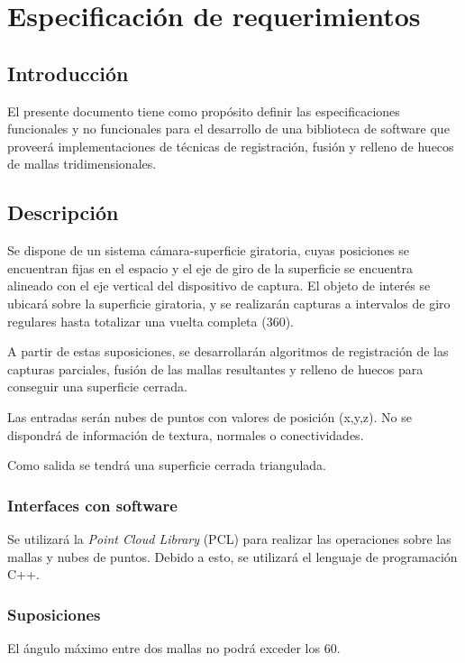 \chapter{Especificación de requerimientos}

	\section{Introducción}
	El presente documento tiene como propósito definir las especificaciones
	funcionales y no funcionales para el desarrollo de una biblioteca de
	software que proveerá implementaciones de técnicas de registración, fusión
	y relleno de huecos de mallas tridimensionales.

	\section{Descripción}
		Se dispone de un sistema cámara-superficie giratoria, cuyas posiciones
		se encuentran fijas en el espacio y el eje de giro de la superficie se
		encuentra alineado con el eje vertical del dispositivo de captura.
		El objeto de interés se ubicará sobre la superficie giratoria, y se
		realizarán capturas a intervalos de giro regulares
		hasta totalizar una vuelta completa (360\textdegree).

		A partir de estas suposiciones, se desarrollarán algoritmos de
		registración de las capturas parciales,
		fusión de las mallas resultantes
		y relleno de huecos para conseguir una superficie cerrada.

		Las entradas serán nubes de puntos con valores de posición (x,y,z).
		No se dispondrá de información de textura, normales o conectividades.

		Como salida se tendrá una superficie cerrada triangulada.

		\subsection{Interfaces con software}
			Se utilizará la \emph{Point Cloud Library} (PCL)
			para realizar las operaciones sobre las mallas y nubes de puntos.
			Debido a esto, se utilizará el lenguaje de programación C++.


		\subsection{Suposiciones}
			El ángulo máximo entre dos mallas no podrá exceder los 60\textdegree.

